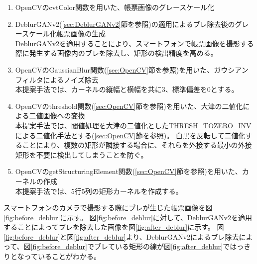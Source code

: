 \begin{enumerate}
    \item OpenCVのcvtColor関数を用いた、帳票画像のグレースケール化
    \item DeblurGANv2(\ref{sec:DeblurGANv2}節を参照)の適用によるブレ除去後のグレースケール化帳票画像の生成\\
        DeblurGANv2を適用することにより、スマートフォンで帳票画像を撮影する際に発生する画像内のブレを除去し、矩形の検出精度を高める。
    \item OpenCVのGaussianBlur関数(\ref{sec:OpenCV}節を参照)を用いた、ガウシアンフィルタによるノイズ除去\\
        本提案手法では、カーネルの縦幅と横幅を共に3、標準偏差を0とする。
    \item OpenCVのthreshold関数(\ref{sec:OpenCV}節を参照)を用いた、大津の二値化による二値画像への変換\\
        本提案手法では、閾値処理を大津の二値化としたTHRESH\_TOZERO\_INVによる二値化手法とする(\ref{sec:OpenCV}節を参照)。
        白黒を反転して二値化することにより、複数の矩形が隣接する場合に、それらを外接する最小の外接矩形を不要に検出してしまうことを防ぐ。
    \item OpenCVのgetStructuringElement関数(\ref{sec:OpenCV}節を参照)を用いた、カーネルの作成\\
        本提案手法では、5行5列の矩形カーネルを作成する。
\end{enumerate}

スマートフォンのカメラで撮影する際にブレが生じた帳票画像を図\ref{fig:before_deblur}に示す。
図\ref{fig:before_deblur}に対して、DeblurGANv2を適用することによってブレを除去した画像を図\ref{fig:after_deblur}に示す。
図\ref{fig:before_deblur}と図\ref{fig:after_deblur}より、DeblurGANv2によるブレ除去によって、図\ref{fig:before_deblur}でブレている矩形の線が図\ref{fig:after_deblur}ではっきりとなっていることがわかる。

